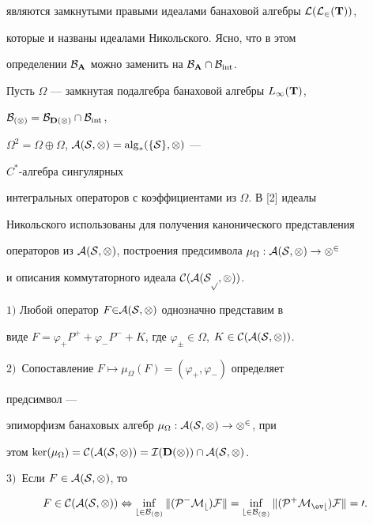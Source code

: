 являются замкнутыми правыми идеалами банаховой алгебры $\cal L(L_2(\bold 


T))$, 


которые и названы идеалами Никольского. Ясно, что в этом 


определении $\cal B_{\bold A}$ можно заменить на $\cal B_{\bold A}\cap\cal 


B_{\Int}$. 


 


Пусть $\Omega$ --- замкнутая подалгебра банаховой алгебры $L_\infty(\bold 


T)$, 


$\cal B_{(\Omega)}=\cal B_{\bold D(\Omega)}\cap\cal B_{\operatorname{int}}$, 


$\Omega^2=\Omega\oplus\Omega$, $\cal A(S,\Omega)=\operatorname{alg}_*(\{S\},\Omega)$ --- 


$C^*$-алгебра сингулярных 


интегральных операторов с коэффициентами из $\Omega$. В [2] идеалы 


Никольского использованы для получения канонического представления 


операторов из $\cal A(S,\Omega)$, построения предсимвола $\mu_\Omega:\cal 


A(S,\Omega)\to\Omega^2$ 


и описания коммутаторного идеала $\cal C(\cal A(S_p,\Omega))$. 


 


\begin{thm} 


$1)$ Любой оператор $F{\in}\cal A(S,\Omega)$ однозначно представим в 


виде $F=\varphi_+P^++\varphi_-P^-+K$, где $\varphi_\pm\in\Omega$, $K\in\cal 


C(\cal A(S,\Omega))$. 


$2)$~Сопоставление $F\mapsto\mu_\Omega(F)=(\varphi_+,\varphi_-)$ определяет 


предсимвол --- 


эпиморфизм банаховых алгебр $\mu_\Omega:\cal A(S,\Omega)\to\Omega^2$, при 


этом $\ker(\mu_\Omega)=\cal C(\cal A(S,\Omega))= \cal I(\bold D(\Omega)) 


\cap\cal A(S,\Omega)$. 


$3)$~Если $F\in\cal A(S,\Omega)$, то 


$$ 


F\in\cal C(\cal A(S,\Omega))\Leftrightarrow 


\inf_{b\in\cal B_{(\Omega)}}\|(P^-M_b)F\|= 


\inf_{b\in\cal B_{(\Omega)}}\|(P^+M_{\ov b})F\|=0. 


$$ 


\end{thm} 


